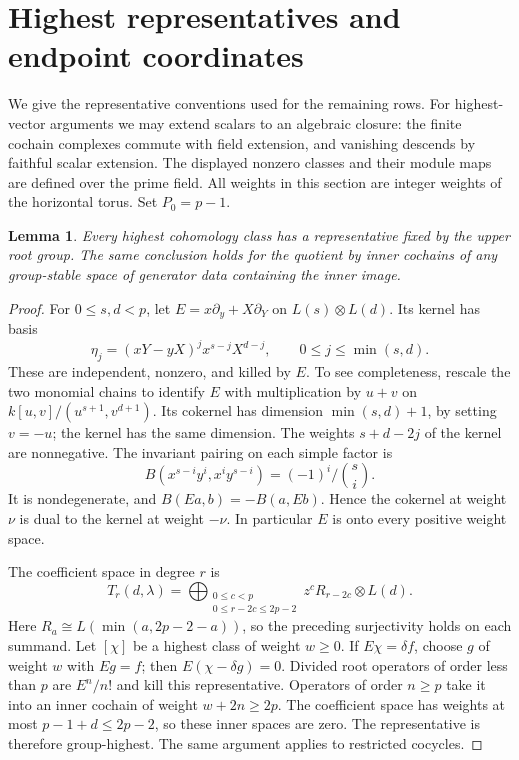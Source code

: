 \documentclass[11pt]{article}
\theoremstyle{plain}
\newtheorem{lemma}[lemma]{Lemma}
\theoremstyle{definition}
\theoremstyle{remark}
\numberwithin{equation}{section}
\newcommand{\kk}{k}
\begin{document}
\section{Highest representatives and endpoint coordinates}\label{sec:highest-data}

We give the representative conventions used for the remaining rows.
For highest-vector arguments we may extend scalars to an algebraic
closure: the finite cochain complexes commute with field extension,
and vanishing descends by faithful scalar extension. The displayed
nonzero classes and their module maps are defined over the prime field.
All weights in this section are integer weights of the horizontal
torus. Set \(P_0=p-1\).

\begin{lemma}\label{lem:highest-lift}
Every highest cohomology class has a representative fixed by the
upper root group. The same conclusion holds for the quotient by
inner cochains of any group-stable space of generator data containing
the inner image.
\end{lemma}
\begin{proof}
For \(0\le s,d<p\), let \(E=x\partial_y+X\partial_Y\) on
\(L(s)\otimes L(d)\). Its kernel has basis
\[
 \eta_j=(xY-yX)^j x^{s-j}X^{d-j},
                  \qquad 0\le j\le\min(s,d).
\]
These are independent, nonzero, and killed by \(E\).
To see completeness, rescale the two monomial chains to identify
\(E\) with multiplication by \(u+v\) on
\(\kk[u,v]/(u^{s+1},v^{d+1})\).
Its cokernel has dimension \(\min(s,d)+1\), by setting \(v=-u\);
the kernel has the same dimension.
The weights \(s+d-2j\) of the kernel are nonnegative.
The invariant pairing on each simple factor is
\[
 B(x^{s-i}y^i,x^iy^{s-i})=(-1)^i/\binom si.
\]
It is nondegenerate, and \(B(Ea,b)=-B(a,Eb)\).
Hence the cokernel at weight \(\nu\) is dual to the kernel
at weight \(-\nu\). In particular \(E\) is onto every positive
weight space.

The coefficient space in degree \(r\) is
\[
 T_r(d,\lambda)=
 \bigoplus_{\substack{0\le c<p\\0\le r-2c\le2p-2}}
     z^cR_{r-2c}\otimes L(d).
\]
Here \(R_a\cong L(\min(a,2p-2-a))\), so the preceding
surjectivity holds on each summand.
Let \([\chi]\) be a highest class of weight \(w\ge0\).
If \(E\chi=\delta f\), choose \(g\) of weight \(w\)
with \(Eg=f\); then \(E(\chi-\delta g)=0\).
Divided root operators of order less than \(p\) are \(E^n/n!\)
and kill this representative.
Operators of order \(n\ge p\) take it into an inner cochain
of weight \(w+2n\ge2p\). The coefficient space has weights at
most \(p-1+d\le2p-2\), so these inner spaces are zero.
The representative is therefore group-highest.
The same argument applies to restricted cocycles.
\end{proof}
\end{document}
